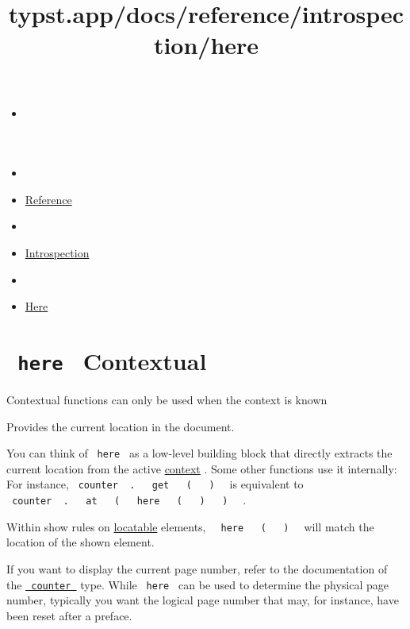 \title{typst.app/docs/reference/introspection/here}

\begin{itemize}
\tightlist
\item
  \href{/docs}{}
\item
  
\item
  \href{/docs/reference/}{Reference}
\item
  
\item
  \href{/docs/reference/introspection/}{Introspection}
\item
  
\item
  \href{/docs/reference/introspection/here/}{Here}
\end{itemize}

\section{\texorpdfstring{\texttt{\ here\ } {{ Contextual
}}}{ here   Contextual }}\label{summary}

\label{contextual-tooltip}
Contextual functions can only be used when the context is known

Provides the current location in the document.

You can think of \texttt{\ here\ } as a low-level building block that
directly extracts the current location from the active
\href{/docs/reference/context/}{context} . Some other functions use it
internally: For instance,
\texttt{\ counter\ }{\texttt{\ .\ }}\texttt{\ }{\texttt{\ get\ }}\texttt{\ }{\texttt{\ (\ }}\texttt{\ }{\texttt{\ )\ }}\texttt{\ }
is equivalent to
\texttt{\ counter\ }{\texttt{\ .\ }}\texttt{\ }{\texttt{\ at\ }}\texttt{\ }{\texttt{\ (\ }}\texttt{\ }{\texttt{\ here\ }}\texttt{\ }{\texttt{\ (\ }}\texttt{\ }{\texttt{\ )\ }}\texttt{\ }{\texttt{\ )\ }}\texttt{\ }
.

Within show rules on
\href{/docs/reference/introspection/location/\#locatable}{locatable}
elements,
\texttt{\ }{\texttt{\ here\ }}\texttt{\ }{\texttt{\ (\ }}\texttt{\ }{\texttt{\ )\ }}\texttt{\ }
will match the location of the shown element.

If you want to display the current page number, refer to the
documentation of the
\href{/docs/reference/introspection/counter/}{\texttt{\ counter\ }}
type. While \texttt{\ here\ } can be used to determine the physical page
number, typically you want the logical page number that may, for
instance, have been reset after a preface.

